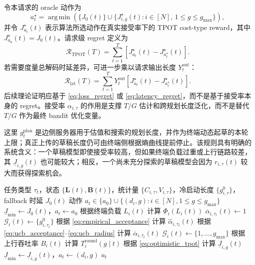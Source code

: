 \documentclass[11pt,a4paper]{ctexart}
\newcommand{\argmin}{\operatorname*{arg\,min}}
\begin{document}
令本请求的 oracle 动作为
\begin{equation}
    a_t^\star
    =
    \argmin
    \left(
    \{J_0(t)\}
    \cup
    \{J_{i,g}^{\star}(t):i\in[N],\,1\leq g\leq g_{\max}\}
    \right),
    \label{eq:oracle_action}
\end{equation}
并令 $J_{a_t}^{\star}(t)$ 表示算法所选动作在真实接受率下的 TPOT cost-type reward，其中 $J_{a_0}^{\star}(t)=J_0(t)$。请求级 regret 定义为
\begin{equation}
    \mathcal{R}_{\mathrm{TPOT}}(T)
    =
    \sum_{t=1}^{T}
    \left[
    J_{a_t}^{\star}(t)
    -
    J_{a_t^\star}^{\star}(t)
    \right].
    \label{eq:loss_regret}
\end{equation}
若需要度量总解码时延差异，可进一步乘以请求输出长度 $Y_t^{\mathrm{out}}$：
\begin{equation}
    \mathcal{R}_{\mathrm{lat}}(T)
    =
    \sum_{t=1}^{T}
    Y_t^{\mathrm{out}}
    \left[
    J_{a_t}^{\star}(t)
    -
    J_{a_t^\star}^{\star}(t)
    \right].
    \label{eq:latency_regret}
\end{equation}
后续理论证明应基于 \cref{eq:loss_regret} 或 \cref{eq:latency_regret}，而不是基于接受率本身的 regret。接受率 $\alpha_{i,\tau}$ 的作用是支撑 $T/G$ 估计和跨规划长度泛化，而不是替代 $T/G$ 作为最终 bandit 优化变量。

这里 $g_t^{\mathrm{plan}}$ 是边侧服务器用于估值和搜索的规划长度，并作为终端动态起草的本轮上限；真正上传的草稿长度仍可由终端侧根据熵曲线提前停止。该规则具有明确的系统含义：一个草稿模型即使接受率较高，但如果终端负载过重或上行链路较差，其 $\underline{J}_{i,g}(t)$ 也可能较大；相反，一个尚未充分探索的草稿模型会因为 $r_{i,\tau}(t)$ 较大而获得探索机会。

\begin{algorithm}[t]
\caption{边侧服务器的 UCB 草稿模型选择}
\label{alg:edge_ucb_selection}
\begin{algorithmic}[1]
\Require 任务类型 $\tau_t$，状态 $\{\mathbf{L}(t),\mathbf{B}(t)\}$，统计量 $\{C_{i,\tau},V_{i,\tau}\}$，冷启动长度 $\{g_{i,\tau}^{0}\}$，fallback 时延 $J_0(t)$
\Ensure 动作 $a_t\in\{a_0\}\cup\{(d_i,g):i\in[N],1\leq g\leq g_{\max}\}$
\State $\underline{J}_{\min}\gets J_0(t)$，$a_t\gets a_0$
    \State 根据终端负载 $L_i(t)$ 计算 $\Phi_i(L_i(t))$
        \State $\overline{\alpha}_{i,\tau_t}(t)\gets 1$
        \State $\mathcal{G}_i(t)\gets\{g_{i,\tau_t}^{0}\}$
    \Else
        \State 根据 \cref{eq:empirical_acceptance} 计算 $\widehat{\alpha}_{i,\tau_t}(t)$
        \State 根据 \cref{eq:ucb_acceptance}--\cref{eq:ucb_radius} 计算 $\overline{\alpha}_{i,\tau_t}(t)$
        \State $\mathcal{G}_i(t)\gets\{1,\ldots,g_{\max}\}$
    \EndIf
        \State 根据上行吞吐率 $B_i(t)$ 计算 $T_i^{\mathrm{round}}(g\mid t)$
        \State 根据 \cref{eq:optimistic_tpot} 计算 $\underline{J}_{i,g}(t)$
            \State $\underline{J}_{\min}\gets\underline{J}_{i,g}(t)$，$a_t\gets(d_i,g)$
        \EndIf
    \EndFor
\EndFor
\State \Return $a_t$
\end{algorithmic}
\end{algorithm}
\end{document}
